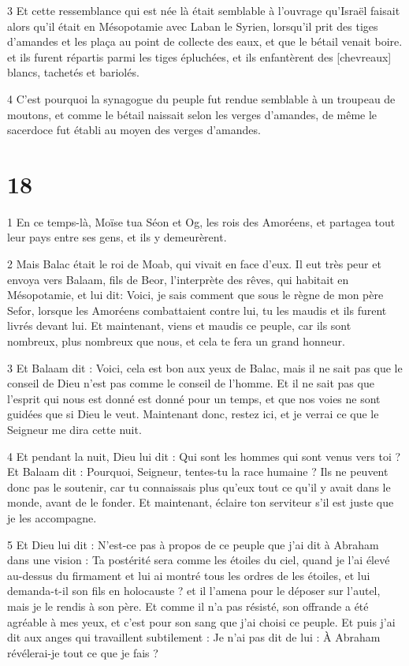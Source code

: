 \par 3 Et cette ressemblance qui est née là était semblable à l'ouvrage qu'Israël faisait alors qu'il était en Mésopotamie avec Laban le Syrien, lorsqu'il prit des tiges d'amandes et les plaça au point de collecte des eaux, et que le bétail venait boire. et ils furent répartis parmi les tiges épluchées, et ils enfantèrent des [chevreaux] blancs, tachetés et bariolés.

\par 4 C'est pourquoi la synagogue du peuple fut rendue semblable à un troupeau de moutons, et comme le bétail naissait selon les verges d'amandes, de même le sacerdoce fut établi au moyen des verges d'amandes.

\chapter{18}

\par 1 En ce temps-là, Moïse tua Séon et Og, les rois des Amoréens, et partagea tout leur pays entre ses gens, et ils y demeurèrent.

\par 2 Mais Balac était le roi de Moab, qui vivait en face d'eux. Il eut très peur et envoya vers Balaam, fils de Beor, l'interprète des rêves, qui habitait en Mésopotamie, et lui dit: Voici, je sais comment que sous le règne de mon père Sefor, lorsque les Amoréens combattaient contre lui, tu les maudis et ils furent livrés devant lui. Et maintenant, viens et maudis ce peuple, car ils sont nombreux, plus nombreux que nous, et cela te fera un grand honneur.

\par 3 Et Balaam dit : Voici, cela est bon aux yeux de Balac, mais il ne sait pas que le conseil de Dieu n'est pas comme le conseil de l'homme. Et il ne sait pas que l'esprit qui nous est donné est donné pour un temps, et que nos voies ne sont guidées que si Dieu le veut. Maintenant donc, restez ici, et je verrai ce que le Seigneur me dira cette nuit.

\par 4 Et pendant la nuit, Dieu lui dit : Qui sont les hommes qui sont venus vers toi ? Et Balaam dit : Pourquoi, Seigneur, tentes-tu la race humaine ? Ils ne peuvent donc pas le soutenir, car tu connaissais plus qu'eux tout ce qu'il y avait dans le monde, avant de le fonder. Et maintenant, éclaire ton serviteur s'il est juste que je les accompagne.

\par 5 Et Dieu lui dit : N'est-ce pas à propos de ce peuple que j'ai dit à Abraham dans une vision : Ta postérité sera comme les étoiles du ciel, quand je l'ai élevé au-dessus du firmament et lui ai montré tous les ordres de les étoiles, et lui demanda-t-il son fils en holocauste ? et il l'amena pour le déposer sur l'autel, mais je le rendis à son père. Et comme il n'a pas résisté, son offrande a été agréable à mes yeux, et c'est pour son sang que j'ai choisi ce peuple. Et puis j'ai dit aux anges qui travaillent subtilement : Je n'ai pas dit de lui : À Abraham révélerai-je tout ce que je fais ?

